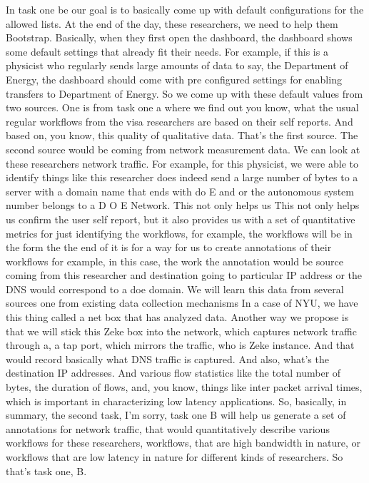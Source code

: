 In task one be our goal is to basically come up with default configurations for the allowed lists. At the end of the day, these researchers, we need to help them Bootstrap. Basically, when they first open the dashboard, the dashboard shows some default settings that already fit their needs. For example, if this is a physicist who regularly sends large amounts of data to say, the Department of Energy, the dashboard should come with pre configured settings for enabling transfers to Department of Energy. So we come up with these default values from two sources. One is from task one a where we find out you know, what the usual regular workflows from the visa researchers are based on their self reports. And based on, you know, this quality of qualitative data. That's the first source. The second source would be coming from network measurement data. We can look at these researchers network traffic. For example, for this physicist, we were able to identify things like this researcher does indeed send a large number of bytes to a server with a domain name that ends with do E and or the autonomous system number belongs to a D O E Network. This not only helps us This not only helps us confirm the user self report, but it also provides us with a set of quantitative metrics for just identifying the workflows, for example, the workflows will be in the form the the end of it is for a way for us to create annotations of their workflows for example, in this case, the work the annotation would be source coming from this researcher and destination going to particular IP address or the DNS would correspond to a doe domain. We will learn this data from several sources one from existing data collection mechanisms In a case of NYU, we have this thing called a net box that has analyzed data. Another way we propose is that we will stick this Zeke box into the network, which captures network traffic through a, a tap port, which mirrors the traffic, who is Zeke instance. And that would record basically what DNS traffic is captured. And also, what's the destination IP addresses. And various flow statistics like the total number of bytes, the duration of flows, and, you know, things like inter packet arrival times, which is important in characterizing low latency applications. So, basically, in summary, the second task, I'm sorry, task one B will help us generate a set of annotations for network traffic, that would quantitatively describe various workflows for these researchers, workflows, that are high bandwidth in nature, or workflows that are low latency in nature for different kinds of researchers. So that's task one, B.



